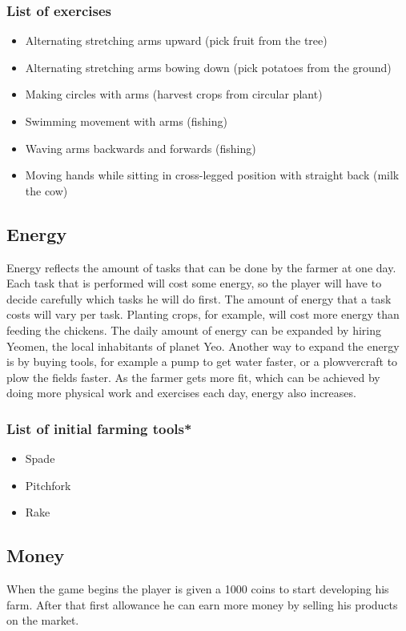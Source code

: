 \documentclass[a4paper,11pt,notitlepage]{report}
\begin{document}
\subsubsection{List of exercises}
\begin{itemize}
\item Alternating stretching arms upward (pick fruit from the tree)
\item Alternating stretching arms bowing down (pick potatoes from the ground)
\item Making circles with arms (harvest crops from circular plant)
\item Swimming movement with arms (fishing)
\item Waving arms backwards and forwards (fishing)
\item Moving hands while sitting in cross-legged position with straight back (milk the cow)
\end{itemize}
\subsection{Energy}
Energy reflects the amount of tasks that can be done by the farmer at one day. Each task that is  performed will cost some energy, so the player will have to decide carefully which tasks he will do first. The amount of energy that a task costs will vary per task. Planting crops, for example, will cost more energy than feeding the chickens. The daily amount of energy can be expanded by hiring Yeomen, the local inhabitants of planet Yeo. Another way to expand the energy is by buying tools, for example a pump to get water faster, or a plowvercraft to plow the fields faster. As the farmer gets more fit, which can be achieved by doing more physical work and exercises each day, energy also increases.

\subsubsection{List of initial farming tools*}
\begin{itemize}
\item Spade
\item Pitchfork
\item Rake
\end{itemize}
\subsection{Money}
When the game begins the player is given a 1000 coins to start developing his farm. After that first allowance he can earn more money by selling his products on the market.
\end{document}
